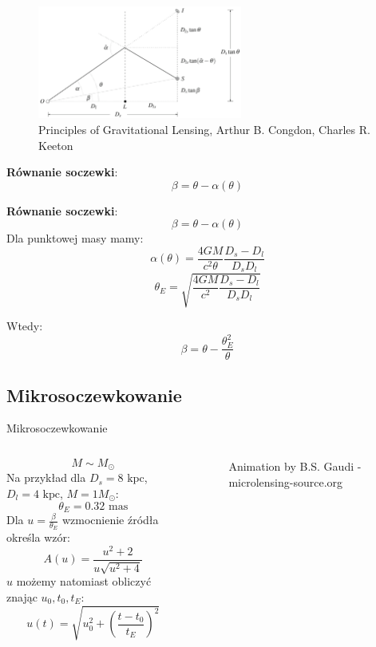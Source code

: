 \documentclass{beamer}
\begin{document}
\begin{frame}
    \begin{figure}
        \centering
        \includegraphics[width=0.6\textwidth]{Screenshot from 2024-06-10 13-41-41.png}
        \caption*{\tiny{Principles of Gravitational
                Lensing, Arthur B. Congdon, Charles R. Keeton}}
    \end{figure}
    \textbf{Równanie soczewki}:
    \[\beta = \theta - \alpha(\theta)\]

\end{frame}

\begin{frame}
    \textbf{Równanie soczewki}:
    \[\beta = \theta - \alpha(\theta)\]
    Dla punktowej masy mamy:
    \[\alpha(\theta) = \frac{4GM}{c^2\theta}\frac{D_s-D_l}{D_s D_l}\]
    \[\theta_E = \sqrt{\frac{4GM}{c^2}\frac{D_s-D_l}{D_s D_l}}\]

    Wtedy:
    \[\beta = \theta - \frac{\theta_E^2}{\theta}\]

\end{frame}

\subsection{Mikrosoczewkowanie}
\begin{frame}{Mikrosoczewkowanie}
    \begin{columns}
        \begin{column}{0.6\linewidth}
            \[M \sim M_{\odot}\]
            Na przykład dla $D_s = 8 \text{ kpc}$, $D_l = 4 \text{ kpc}$, $M = 1 M_{\odot}$:
            \[\theta_E = 0.32 \text{ mas}\]
            Dla $u = \frac{\beta}{\theta_E}$ wzmocnienie źródła określa wzór:
            \[A(u) = \frac{u^2 + 2}{u \sqrt{u^2 + 4}}\]
            $u$ możemy natomiast obliczyć znając $u_0, t_0, t_E$:
            \[u(t) = \sqrt{u_0^2 + \left(\frac{t-t_0}{t_E}\right)^2}\]
        \end{column}
        \begin{column}{0.4\linewidth}
            \begin{figure}
                \centering
                \caption*{\tiny{Animation by B.S. Gaudi - microlensing-source.org}}
            \end{figure}
        \end{column}
    \end{columns}

\end{frame}
\end{document}
